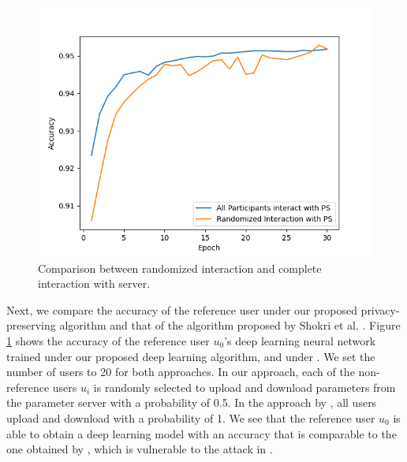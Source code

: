 \documentclass[conference]{IEEEtran}
\begin{document}
\begin{figure}[!h]
\centering
\includegraphics[width=\columnwidth, keepaspectratio]{RandomVsAll}
\caption{Comparison between randomized interaction and complete interaction with server. }
\label{fig:RandVsAll}
\end{figure}
Next, we compare the accuracy of the reference user under our proposed privacy-preserving algorithm and that of the algorithm proposed
by Shokri et al. \cite{shokri2015privacy}. Figure \ref{fig:RandVsAll} shows the accuracy of the reference user $u_0$'s deep learning
neural network trained under our proposed deep learning algorithm, and under \cite{shokri2015privacy}. We set the number of
users to 20 for both approaches. In our approach, each of the non-reference users $u_i$ is randomly
selected to upload and download parameters from the parameter server with a probability of 0.5. 
In the approach by \cite{shokri2015privacy}, all users upload and download with a probability of 1. 
We see that the reference user $u_0$ is able to obtain a deep learning model with an accuracy that is comparable to the one
obtained by \cite{shokri2015privacy}, which is vulnerable to the attack in \cite{hitaj2017deep}. 
\end{document}
